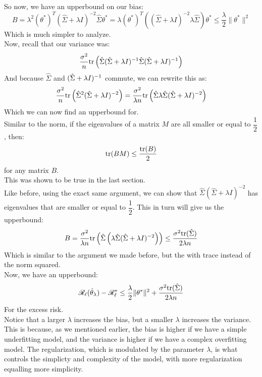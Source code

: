 \documentclass[12pt]{article}
\begin{document}
So now, we have an upperbound on our bias:
\[ B = \lambda^2(\theta^*)^T
(\hat{\Sigma} + \lambda I)^{-2}
\hat{\Sigma} \theta^*
= \lambda(\theta^*)^T (
(\hat{\Sigma} + \lambda I)^{-2} 
\lambda\hat{\Sigma}) \theta^* 
\leq \dfrac{\lambda}{2}\|\theta^*\|^2 \]
Which is much simpler to analyze. \\

Now, recall that our variance was:
\[ \dfrac{\sigma^2}{n}
\text{tr}\left(  \hat{\Sigma} (\hat{\Sigma} + \lambda I)^{-1}
\hat{\Sigma}(\hat{\Sigma} + \lambda I)^{-1}  \right) \]
And because $\hat{\Sigma}$ and 
$(\hat{\Sigma} + \lambda I)^{-1}$
commute, we can rewrite this as:
\[ \dfrac{\sigma^2}{n}
\text{tr}\left(  \hat{\Sigma}^2 (\hat{\Sigma} + \lambda I)^{-2} \right)
= \dfrac{\sigma^2}{\lambda n}
\text{tr}\left(  \hat{\Sigma}\lambda\hat{\Sigma} 
(\hat{\Sigma} + \lambda I)^{-2} \right)\]
Which we can now find an upperbound for. \\

Similar to the norm, 
if the eigenvalues of a matrix $M$
are all smaller or equal to $\dfrac{1}{2}$, then:
\[ \text{tr}(BM) \leq \dfrac{\text{tr}(B)}{2} \]
for any matrix $B$. \\
This was shown to be true in the last section. \\

Like before, using the exact same
argument, we can show that $\hat{\Sigma} 
(\hat{\Sigma} + \lambda I)^{-2}$
has eigenvalues that are smaller or equal 
to $\dfrac{1}{2}$. 
This in turn will give us the upperbound:
\[ B = \dfrac{\sigma^2}{\lambda n}
\text{tr}\left(  \hat{\Sigma} \left(  \lambda\hat{\Sigma} 
(\hat{\Sigma} + \lambda I)^{-2} \right) \right)
\leq \dfrac{\sigma^2 \text{tr}(\hat{\Sigma})}{2\lambda n}\]
Which is similar to the argument we made before,
but the with trace instead of the norm squared. \\

Now, we have an upperbound:
\[ \mathscr{R}_{\ell}(\hat{\theta}_\lambda) - \mathscr{R}_{\ell}^*
\leq \dfrac{\lambda}{2}\|\theta^*\|^2 +
\dfrac{\sigma^2 \text{tr}(\hat{\Sigma})}{2\lambda n} \]
For the excess risk. \\

Notice that a larger $\lambda$ increases
the bias, but a smaller $\lambda$
increases the variance. \\
This is because, as we mentioned earlier,
the bias is higher if we have a simple 
underfitting model,
and the variance is higher if we have a
complex overfitting model.
The regularization, which is modulated by 
the parameter $\lambda$,
is what controls the simplicty
and complexity of the model,
with more regularization equalling
more simplicity. \\
\end{document}
